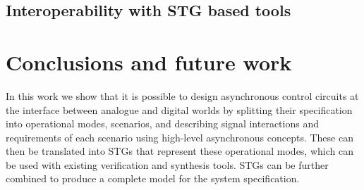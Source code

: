 \documentclass[british, journal]{IEEEtran}
\newcommand{\noun}[1]{\textsc{#1}}
\begin{document}
%
%

\subsection{Interoperability with STG based tools \label{sub:interop-with-stg}}

\section{Conclusions and future work\label{sec:conclusions}}

In this work we show that it is possible to design asynchronous control
circuits at the interface between analogue and digital worlds by
splitting their specification into operational modes, scenarios, and
describing signal interactions and requirements of each scenario using
high-level asynchronous concepts. These can then be translated into STGs
that represent these operational modes, which can be used with existing
verification and synthesis tools. STGs can be further combined to
produce a complete model for the system specification.
\end{document}
